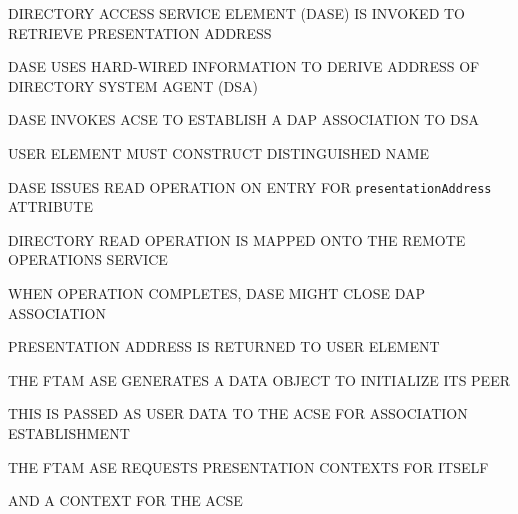 \begin{bwslide}

\begin{nrtc}
\item	DIRECTORY ACCESS SERVICE ELEMENT (DASE) IS INVOKED TO RETRIEVE
	PRESENTATION ADDRESS

\item	DASE USES HARD-WIRED INFORMATION TO DERIVE ADDRESS OF DIRECTORY SYSTEM
	AGENT (DSA)

\item	DASE INVOKES ACSE TO ESTABLISH A DAP ASSOCIATION TO DSA

\item	USER ELEMENT MUST CONSTRUCT DISTINGUISHED NAME
\end{nrtc}
\end{bwslide}


\begin{bwslide}

\begin{nrtc}
\item	DASE ISSUES READ OPERATION ON ENTRY FOR \verb"presentationAddress"
	ATTRIBUTE

\item	DIRECTORY READ OPERATION IS MAPPED ONTO THE REMOTE OPERATIONS SERVICE

\item	WHEN OPERATION COMPLETES, DASE MIGHT CLOSE DAP ASSOCIATION

\item	PRESENTATION ADDRESS IS RETURNED TO USER ELEMENT
\end{nrtc}
\end{bwslide}




\begin{bwslide}

\begin{nrtc}
\item	THE FTAM ASE GENERATES A DATA OBJECT TO INITIALIZE ITS PEER

\item	THIS IS PASSED AS USER DATA TO THE ACSE FOR ASSOCIATION ESTABLISHMENT

\item	THE FTAM ASE REQUESTS PRESENTATION CONTEXTS FOR ITSELF
    \begin{nrtc}
    \item	AND A CONTEXT FOR THE ACSE
    \end{nrtc}
\end{nrtc}
\end{bwslide}


